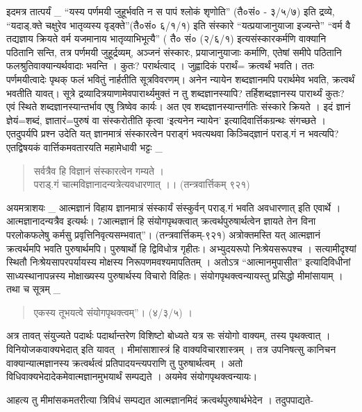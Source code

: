 इदमत्र तात्पर्यं _ “यस्य पर्णमयी जुहूर्भवति न स पापं श्लोकं शृणोति” (तै०सं० - ३/५/७) इति द्रव्ये, “यदाड्.क्ते चक्षुरेव भातृव्यस्य वृड्क्ते”(तै०सं० ६/­१/१) इति संस्कारे “यत्प्रयाजानुयाजा इज्यन्ते” “वर्म वै तद्यज्ञाय क्रियते वर्म यजमानाय भातृव्याभिभूत्यै” ( तै० सं० (२/६/१) इत्यसंस्कारकर्मणि वाक्यानि पठितानि सन्ति, तत्र पर्णमयी जुहूर्द्रव्यम्, अञ्जनं संस्कारः, प्रयाजानुयाजाः कर्माणि, एतेषां समीपे पठितानि फलश्रुतिवाक्यान्यर्थवादाः भवन्ति । कुतः? परार्थत्वाद् । जुह्वादिकं परार्थं= क्रत्वर्थं भवति। ततः पर्णमयीत्वादेः पृथक् फलं भवितुं नार्हतीति सूत्रविवरणम्। अनेन न्यायेन शब्दज्ञानमपि परार्थमेव भवति, क्रत्वर्थं भवतीति यावत्। सूत्रे द्रव्यादित्रयाणामेवपारार्थ्यमुक्तं न तु शब्दज्ञानस्यापि? तर्हिशब्दज्ञानस्य पारार्थ्यं कुतः? एवं स्थिते शब्दज्ञानस्यान्तर्भाव एषु त्रिष्वेव कार्यः। अत एव शब्दज्ञानस्यान्तर्गतिः संस्कारे क्रियते । इदं ज्ञानं ज्ञेयं=शब्दं, ज्ञातारं=पुरुषं वा संस्करोतीति कृत्वा ‘इत्यनेन न्यायेन’ इत्यादिवार्त्तिकग्रन्थः संगच्छते । एतदुपर्यपि प्रश्न उदेति यत् ज्ञानमात्रं संस्कारत्वेन पराड्गं भवत्यथवा किञ्चिद्ज्ञानं पराड्.गं न भवत्यपि? एतद्विषयकं वार्त्तिकमवतारयति महामेधावी भट्टः _
\begin{verse}
सर्वत्रैव हि विज्ञानं संस्कारत्वेन गम्यते ।\\
पराड्.गं चात्मविज्ञानादन्यत्रेत्यवधारणात् ।। (तन्त्रवार्त्तिकम् ९२१)
\end{verse}
अयमत्राशयः _ आत्मज्ञानं विहाय ज्ञानमात्रं संस्कार्यं संस्कुर्वन् पराड्.गं भवति अवधारणात् इति एवार्थे । आत्मज्ञानादन्यत्रैव इत्यर्थः। 7आत्मज्ञानं हि संयोगपृथक्त्वात् क्रत्वर्थपुरुषार्थत्वेन ज्ञायते तेन विना परलोकफलेषु कर्मसु प्रवृत्तिनिवृत्यसम्भवात्”। (तन्त्रवार्त्तिकम्-९२१) अत्रोक्तमस्ति यत् आत्मज्ञानं क्रत्वर्थमपि भवति पुरुषार्थमपि। पुरुषार्थो हि द्विविधोत्र गृहीतः। अभ्युदयरूपो निःश्रेयसरूपश्च । सत्यामीदृश्यां स्थितौ निःश्रेयसापरपर्यायस्य मोक्षस्य निरूपणमवश्यमापतितम् । अतोऽत्र “आत्मानमुपासीत” इत्यादिविधीनां साध्यस्थानापन्नस्य मोक्षाख्यस्य पुरुषार्थस्य विचारो विहितः। संयोगपृथक्त्वन्यायस्तु प्रसिद्धो मीमांसायाम् । तथा च सूत्रम् _ 
\begin{verse}
एकस्य तूभयत्वे संयोगपृथक्त्वम्”। (४/३/५) । 
\end{verse}
अत्र तावत् संयुज्यते पदार्थः पदार्थान्तरेण विशिष्टो बोध्यते यत्र सः संयोगो वाक्यम्, तस्य पृथक्त्वात् । विनियोजकवाक्यभेदात् इति यावत् । मीमांसाशास्त्रं हि वाक्यविचारशास्त्रम् । तत्र उपनिषत्सु कानिचन वाक्यान्यात्मज्ञानस्य क्रत्वर्थत्वं प्रतिपादयन्त्यपराणि तु पुरुषार्थत्वम् । अतो विधिवाक्यभेदादेकमेवात्मज्ञानमुभयार्थं सम्पद्यते । अयमेव संयोगपृथक्त्वन्यायः।

आहत्य तु मीमांसकमतरीत्या त्रिविधं सम्पद्यत आत्मज्ञानमिदं क्रत्वर्थपुरुषार्थभेदेन । तदुपपाद्यते-

